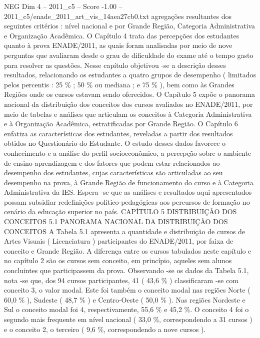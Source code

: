 \begin{textsample}{NEG Dim 4 – 2011\_c5 – Score -1.00 – 2011\_c5/enade\_2011\_art\_vis\_14aea27cb0.txt}  \label{ex:f4_neg_115}
agregações resultantes dos seguintes critérios : nível nacional e por Grande Região, Categoria Administrativa e Organização Acadêmica.
O Capítulo 4 trata das percepções dos estudantes quanto à prova ENADE/2011, as quais foram analisadas por meio de nove perguntas que avaliaram desde o grau de dificuldade do exame até o tempo gasto para resolver as questões.
Nesse capítulo objetivou -se a descrição desses resultados, relacionando os estudantes a quatro grupos de desempenho ( limitados pelos percentis : 25 \% ; 50 \% ou mediana ; e 75 \% ), bem como às Grandes Regiões onde os cursos estavam sendo oferecidos.
O Capítulo 5 expõe o panorama nacional da distribuição dos conceitos dos cursos avaliados no ENADE/2011, por meio de tabelas e análises que articulam os conceitos à Categoria Administrativa e à Organização Acadêmica, estratificadas por Grande Região.
O Capítulo 6 enfatiza as características dos estudantes, reveladas a partir dos resultados obtidos no Questionário do Estudante.
O estudo desses dados favorece o conhecimento e a análise do perfil socioeconômico, a percepção sobre o ambiente de ensino-aprendizagem e dos fatores que podem estar relacionados ao desempenho dos estudantes, cujas características são articuladas ao seu desempenho na prova, à Grande Região de funcionamento do curso e à Categoria Administrativa da IES.
Espera -se que as análises e resultados aqui apresentados possam subsidiar redefinições político-pedagógicas aos percursos de formação no cenário da educação superior no país.
CAPÍTULO 5 DISTRIBUIÇÃO DOS CONCEITOS 5.1 PANORAMA NACIONAL DA DISTRIBUIÇÃO DOS CONCEITOS A Tabela 5.1 apresenta a quantidade e distribuição de cursos de Artes Visuais ( Licenciatura ) participantes do ENADE/2011, por faixa de conceito e Grande Região.
A diferença entre os cursos tabulados neste capítulo e no capítulo 2 são os cursos sem conceito, em princípio, aqueles sem alunos concluintes que participassem da prova.
Observando -se os dados da Tabela 5.1, nota -se que, dos 94 cursos participantes, 41 ( 43,6 \% ) classificaram -se com conceito 3, o valor modal.
Este foi também o conceito modal nas regiões Norte ( 60,0 \% ), Sudeste ( 48,7 \% ) e Centro-Oeste ( 50,0 \% ).
Nas regiões Nordeste e Sul o conceito modal foi 4, respectivamente, 55,6 \% e 45,2 \%.
O conceito 4 foi o segundo mais frequente em nível nacional ( 33,0 \%, correspondendo a 31 cursos ) e o conceito 2, o terceiro ( 9,6 \%, correspondendo a nove cursos ).

\end{textsample}
